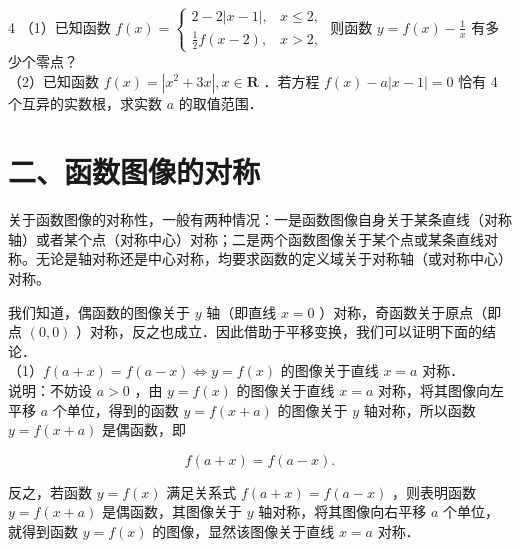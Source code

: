 \documentclass[10pt]{article}
\begin{document}
4 （1）已知函数 \(f(x)=\left\{\begin{array}{ll}2-2|x-1|, & x \leqslant 2, \\ \frac{1}{2} f(x-2), & x>2,\end{array}\right.\) 则函数 \(y=f(x)-\frac{1}{x}\) 有多少个零点？\\
（2）已知函数 \(f(x)=\left|x^{2}+3 x\right|, x \in \mathbf{R}\) ．若方程 \(f(x)-a|x-1|=0\) 恰有 4 个互异的实数根，求实数 \(a\) 的取值范围．

\section*{二、函数图像的对称}
关于函数图像的对称性，一般有两种情况：一是函数图像自身关于某条直线（对称轴）或者某个点（对称中心）对称；二是两个函数图像关于某个点或某条直线对称。无论是轴对称还是中心对称，均要求函数的定义域关于对称轴（或对称中心）对称。

我们知道，偶函数的图像关于 \(y\) 轴（即直线 \(x=0\) ）对称，奇函数关于原点（即点 \((0,0)\) ）对称，反之也成立．因此借助于平移变换，我们可以证明下面的结论．\\
（1）\(f(a+x)=f(a-x) \Leftrightarrow y=f(x)\) 的图像关于直线 \(x=a\) 对称．\\
说明：不妨设 \(a>0\) ，由 \(y=f(x)\) 的图像关于直线 \(x=a\) 对称，将其图像向左平移 \(a\) 个单位，得到的函数 \(y=f(x+a)\) 的图像关于 \(y\) 轴对称，所以函数 \(y=f(x+a)\) 是偶函数，即

\[
f(a+x)=f(a-x) .
\]

反之，若函数 \(y=f(x)\) 满足关系式 \(f(a+x)=f(a-x)\) ，则表明函数 \(y=f(x+a)\) 是偶函数，其图像关于 \(y\) 轴对称，将其图像向右平移 \(a\) 个单位，就得到函数 \(y=f(x)\) 的图像，显然该图像关于直线 \(x=a\) 对称．
\end{document}

